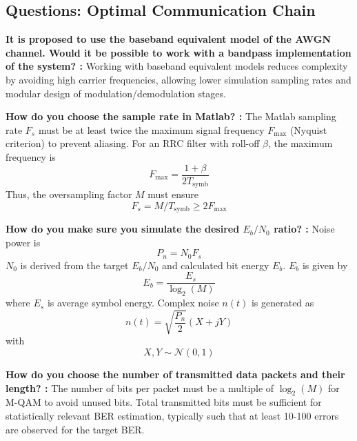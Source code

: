 \documentclass[11pt]{article}
\begin{document}
	\subsection{Questions: Optimal Communication Chain}
	\par\noindent\textbf{It is proposed to use the baseband equivalent model of the AWGN channel. Would it be possible to work with a bandpass implementation of the system? :}\quad\ignorespaces 
		Working with baseband equivalent models reduces complexity by avoiding high carrier frequencies, allowing lower simulation sampling rates and modular design of modulation/demodulation stages.
	\par
	
	\par\noindent\textbf{How do you choose the sample rate in Matlab? :}\quad\ignorespaces 
		The Matlab sampling rate $F_s$ must be at least twice the maximum signal frequency $F_{\text{max}}$ (Nyquist criterion) to prevent aliasing. For an RRC filter with roll-off $\beta$, the maximum frequency is
		\begin{equation} F_{\text{max}} = \frac{1+\beta}{2T_{\text{symb}}} \end{equation}
		Thus, the oversampling factor $M$ must ensure
		\begin{equation} F_s = M/T_{\text{symb}} \ge 2 F_{\text{max}} \end{equation}
	\par
	
	\par\noindent\textbf{How do you make sure you simulate the desired $E_b/N_0$ ratio? :}\quad\ignorespaces 
		Noise power is 
		\begin{equation} P_n = N_0 F_s \end{equation}
		$N_0$ is derived from the target $E_b/N_0$ and calculated bit energy $E_b$. $E_b$ is given by
		\begin{equation} E_b = \frac{E_s}{\log_2(M)} \end{equation}
		where $E_s$ is average symbol energy. Complex noise $n(t)$ is generated as
		\begin{equation} n(t) = \sqrt{\frac{P_n}{2}}(X+jY) \end{equation}
		with 
		\begin{equation} X, Y \sim \mathcal{N}(0,1) \end{equation}
	\par
	
	\par\noindent\textbf{How do you choose the number of transmitted data packets and their length? :}\quad\ignorespaces 
		The number of bits per packet must be a multiple of $\log_2(M)$ for M-QAM to avoid unused bits. Total transmitted bits must be sufficient for statistically relevant BER estimation, typically such that at least 10-100 errors are observed for the target BER.
	\par
			
\end{document}
